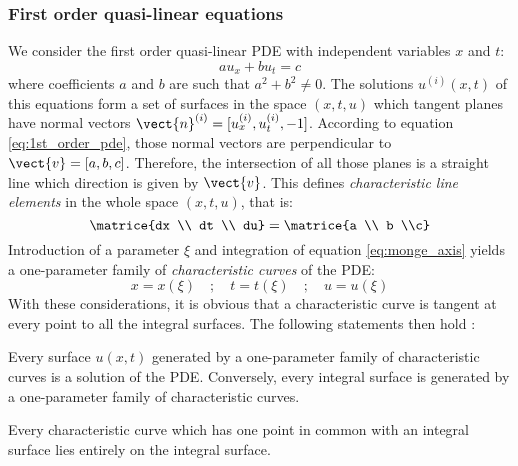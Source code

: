 \subsubsection*{First order quasi-linear equations}
We consider the first order quasi-linear PDE with independent variables $x$ and $t$:
\begin{equation}
  \label{eq:1st_order_pde}
   a u_x + b u_t  = c
\end{equation}
where coefficients $a$ and $b$ are such that $a^2 + b^2 \neq 0$. The solutions $u^{(i)}(x,t)$ of this equations form a set of surfaces in the space $(x,t,u)$ which tangent planes have normal vectors $\vect{n}^{(i)}=[u^{(i)}_x,u^{(i)}_t,-1]$. According to equation \ref{eq:1st_order_pde}, those normal vectors are perpendicular to $\vect{v}=[a,b,c]$. Therefore, the intersection of all those planes is a straight line which direction is given by $\vect{v}$. This defines \textit{characteristic line elements} in the whole space $(x,t,u)$, that is:
\begin{equation}
  \label{eq:monge_axis}
  \matrice{dx \\ dt \\ du} = \matrice{a \\ b \\c}
\end{equation}
Introduction of a parameter $\xi$ and integration of equation \ref{eq:monge_axis} yields a one-parameter family of \textit{characteristic curves} of the PDE:
\begin{equation*}
  x=x(\xi) \quad ; \quad t=t(\xi) \quad ; \quad u=u(\xi)
\end{equation*}
With these considerations, it is obvious that a characteristic curve is tangent at every point to all the integral surfaces. The following statements then hold \cite[p.63-64]{Courant}:
\begin{theorem}
  \label{th:integral_surface_generated}
  Every surface $u(x,t)$ generated by a one-parameter family of characteristic curves is a solution of the PDE. Conversely, every integral surface is generated by a one-parameter family of characteristic curves.
\end{theorem}
\begin{theorem}
  \label{th:charac_in_integral_surface}
  Every characteristic curve which has one point in common with an integral surface lies entirely on the integral surface.
\end{theorem}

